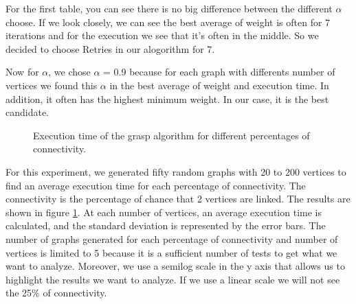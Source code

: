 For the first table, you can see there is no big difference between the different $\alpha$ choose.
If we look closely, we can see the best average of weight is often for 7 iterations and for the execution we see that it's often in the middle.
So we decided to choose Retries in our alogorithm for 7.
\bigskip

Now for $\alpha$, we chose $\alpha$ = 0.9 because for each graph with differents number of vertices we found this $\alpha$ in the best average of weight and execution time.
In addition, it often has the highest  minimum weight. In our case, it is the best candidate.


\begin{figure}[H]
    \centering
    \caption{Execution time of the grasp algorithm for different percentages of connectivity.}
    \label{fig:grasp_time}
\end{figure}

For this experiment, we generated fifty random graphs with 20 to 200 vertices to
find an average execution time for each percentage of connectivity. The connectivity is the percentage of chance that 2 vertices are linked. The results
are shown in figure \ref{fig:grasp_time}. At each number of vertices, an average
execution time is calculated, and the standard deviation is represented by the
error bars. The number of graphs generated for each
percentage of connectivity and number of vertices is limited to 5 because it is a sufficient
number of tests to get what we want to analyze. Moreover, we use a semilog scale in the y axis that allows
us to highlight the results we want to analyze. If we use a linear scale we will not see the 25\% of connectivity.
